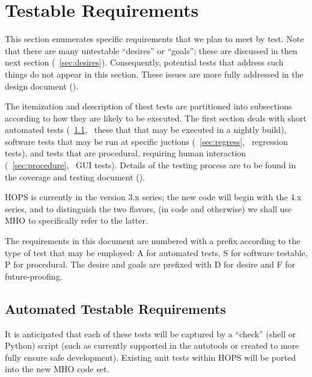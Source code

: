 %
%
%

\section{Testable Requirements}
\label{sec:testable}

This section enumerates specific requirements that we plan to meet by test.
Note that there are many untestable ``desires'' or ``goals''; these are
discussed in then next section (\Sec~\ref{sec:desires}).  Consequently,
potential tests that address such things do not appear in this section.
These issues are more fully addressed in the design document (\cite{design}).

The itemization and description of thest tests are partitioned into
subsections according to how they are likely to be executed.
The first section deals with short automated tests
(\Sec~\ref{sec:auto}, \ie~these that that may be executed
in a nightly build), software tests that may be run at specific
juctions (\Sec~\ref{sec:regress}, \ie~regression tests),
and tests that are procedural, requiring human interaction
(\Sec~\ref{sec:procedure}, \ie~\ac{GUI} tests).%
Details of the testing process are to be found in the coverage
and testing document (\cite{cover}).

\acs{HOPS} is currently in the version 3.x series; the new code will
begin with the 4.x series, and to distinguish the two flavors, (in code
and otherwise) we shall use \acs{MHO} to specifically refer to the latter.

The requirements in this document are numbered with a prefix
according to the type of test that may be employed:
A for automated tests, S for software testable, P for procedural.
The desire and goals are prefixed with D for desire and
F for future-proofing.

\subsection{Automated Testable Requirements}
\label{sec:auto}

It is anticipated that each of these tests will be captured by a
``check'' (shell or Python) script (such as currently supported in
the autotools or created to more fully ensure safe development).
Existing unit tests within \ac{HOPS} will be ported into the
new \ac{MHO} code set.

